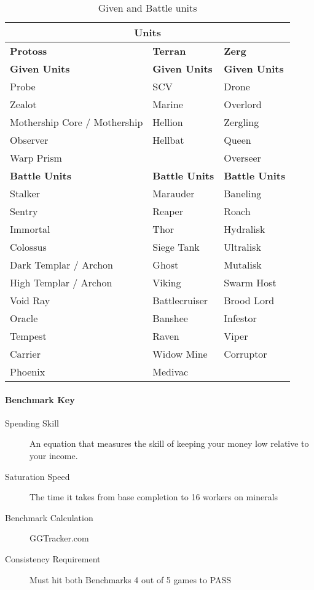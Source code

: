 \documentclass{article}
\begin{document}
\begin{table}[h]
    \caption{Given and Battle units}
    \begin{tabularx}{\linewidth}{|X|X|X|}
         \hline
         \multicolumn{3}{|c|}{\textbf{Units}}\\
         \hline
         \textbf{Protoss} & \textbf{Terran} & \textbf{Zerg} \\
         \hline
         \textbf{Given Units} & \textbf{Given Units} & \textbf{Given Units} \\
         \hline
         Probe & SCV & Drone\\
         \hline
         Zealot & Marine & Overlord\\
         \hline
         Mothership Core / Mothership & Hellion & Zergling\\
         \hline
         Observer & Hellbat & Queen\\
         \hline
         Warp Prism &  & Overseer\\
         \hline
         \textbf{Battle Units} & \textbf{Battle Units} & \textbf{Battle Units}\\
         \hline
         Stalker & Marauder & Baneling\\
         \hline
         Sentry & Reaper & Roach\\
         \hline
         Immortal & Thor & Hydralisk\\
         \hline
         Colossus & Siege Tank & Ultralisk\\
         \hline
         Dark Templar / Archon & Ghost & Mutalisk\\
         \hline
         High Templar / Archon & Viking & Swarm Host\\
         \hline
         Void Ray  & Battlecruiser & Brood Lord\\
         \hline
         Oracle & Banshee & Infestor\\
         \hline
         Tempest & Raven & Viper\\
         \hline
         Carrier & Widow Mine & Corruptor\\
         \hline
         Phoenix & Medivac & \\
         \hline
    \end{tabularx}
\end{table}

\paragraph{Benchmark Key}
\begin{description}
    \item[Spending Skill] An equation that measures the skill of keeping your
        money low relative to your income.
    \item[Saturation Speed] The time it takes from base completion to 16 workers
        on minerals
    \item[Benchmark Calculation] GGTracker.com
    \item[Consistency Requirement] Must hit both Benchmarks 4 out of 5 games to
        PASS
\end{description}
\end{document}
